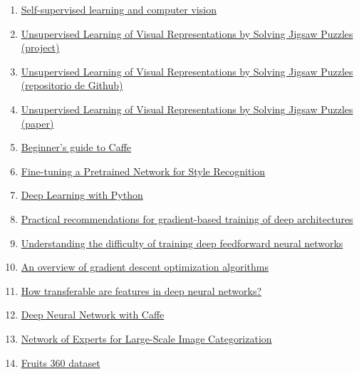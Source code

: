 \documentclass[10pt,a4paper]{article}
\begin{document}
\begin{enumerate}
	\item \href{https://www.fast.ai/2020/01/13/self_supervised/}{Self-supervised learning and computer vision }
	\item \href{https://www.cvg.unibe.ch/media/project/noroozi/JigsawPuzzleSolver.html}{Unsupervised Learning of Visual Representations by Solving Jigsaw Puzzles (project)}
	\item \href{https://github.com/MehdiNoroozi/JigsawPuzzleSolver}{Unsupervised Learning of Visual Representations by Solving Jigsaw Puzzles (repositorio de Github)}
	\item \href{https://arxiv.org/pdf/1603.09246v3.pdf}{Unsupervised Learning of Visual Representations by Solving Jigsaw Puzzles (paper)}
	\item \href{https://recodeminds.com/blog/a-beginners-guide-to-caffe-for-deep-learning/}{Beginner's guide to Caffe}
	\item \href{https://github.com/BVLC/caffe/blob/master/examples/02-fine-tuning.ipynb}{Fine-tuning a Pretrained Network for Style Recognition}
	\item \href{http://faculty.neu.edu.cn/yury/AAI/Textbook/Deep\%20Learning\%20with\%20Python.pdf}{Deep Learning with Python}
	\item \href{https://arxiv.org/abs/1206.5533}{Practical recommendations for gradient-based training of deep architectures}
	\item \href{http://proceedings.mlr.press/v9/glorot10a.html}{Understanding the difficulty of training deep feedforward neural networks}
	\item \href{https://arxiv.org/pdf/1609.04747.pdf}{An overview of gradient descent optimization algorithms}
	\item \href{https://arxiv.org/abs/1411.1792}{How transferable are features in deep neural networks?}
	\item \href{https://github.com/arundasan91/Deep-Learning-with-Caffe/blob/master/Deep-Neural-Network-with-Caffe/Deep\%20Neural\%20Network\%20with\%20Caffe.md}{Deep Neural Network with Caffe}
	\item \href{https://www.researchgate.net/publication/301835547_Network_of_Experts_for_Large-Scale_Image_Categorization}{Network of Experts for Large-Scale Image Categorization}
	\item \href{https://www.kaggle.com/moltean/fruits}{Fruits 360 dataset}
\end{enumerate}
\end{document}
